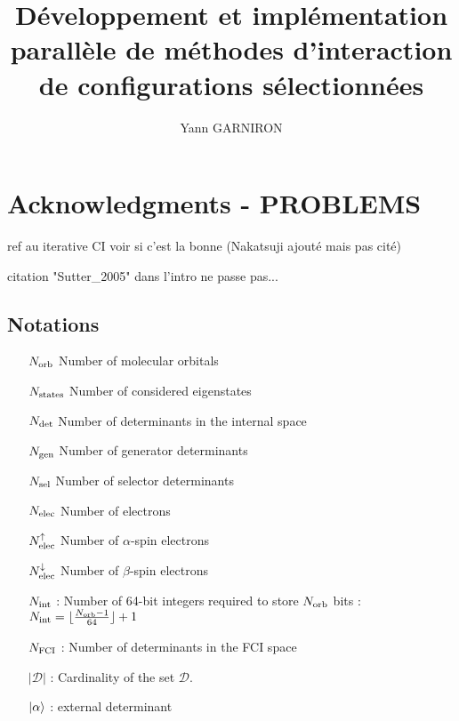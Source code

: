 \documentclass[12pt,a4paper]{report}
\title{Développement et implémentation parallèle de méthodes d'interaction de configurations sélectionnées}
\author{Yann GARNIRON}
\begin{document}
\dominitoc


\newpage

\chapter*{Acknowledgments - PROBLEMS}





ref au iterative CI voir si c'est la bonne (Nakatsuji ajouté mais pas cité)

citation "Sutter\_2005" dans l'intro ne passe pas...


\newpage

\tableofcontents
\newpage

\section*{Notations}

\begin{itemize}

\item [${N_\text{orb}}$] Number of molecular orbitals

\item [${N_\text{states}}$] Number of considered eigenstates

\item [${N_\text{det}}$] Number of determinants in the internal space

\item [${N_\text{gen}}$] Number of generator determinants 

\item [${N_\text{sel}}$] Number of selector determinants

\item [${N_\text{elec}}$] Number of electrons

\item [${N_\text{elec}^{\uparrow}}$] Number of $\alpha$-spin electrons

\item [${N_\text{elec}^{\downarrow}}$] Number of $\beta$-spin electrons

\item [${N_\text{int}}$] : Number of 64-bit integers required to store ${N_\text{orb}}$ bits : 
${{N_\text{int}} = \lfloor \frac{{N_\text{orb}}-1}{64} \rfloor + 1}$

%

\item [$N_\text{FCI}$] : Number of determinants in the FCI space

\item [$|\mathcal{D}|$] : Cardinality of the set $\mathcal{D}$.

\item [${\ket{\alpha}}$] : external determinant
\end{itemize}
\end{document}
